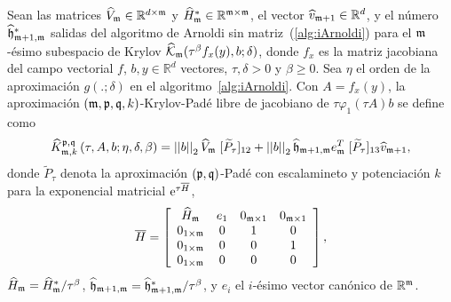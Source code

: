 \begin{definition}\label{def:gen_kp_aprox_fj}
	Sean las matrices $\widehat{V}_{\mathfrak{m}}\in\mathbb{R}^{d\times \mathfrak{m}}$ y $\widehat{H}^*_{\mathfrak{m}}\in\mathbb{R}^{{\mathfrak{m}} \times {\mathfrak{m}}}$, el vector $\widehat{v}_{\mathfrak{m}+1}\in\mathbb{R}^d$, y el número  $ \widehat{\mathfrak{h}}^*_{\mathfrak{m}+1,\mathfrak{m}}$ salidas del algoritmo de Arnoldi sin matriz~(\ref{alg:iArnoldi}) para el $\mathfrak{m}$-ésimo subespacio de Krylov $\widehat{\mathcal{K}}_{\mathfrak{m}}(\tau^\beta f_x(y),b;\delta)$, donde $f_x$ es la matriz jacobiana del campo vectorial $f$, $b,y\in\mathbb{R}^d$ vectores, $\tau,\delta>0$ y $\beta \ge 0$. Sea $\eta$ el orden de la aproximación $g(.;\delta)$ en el algoritmo~\ref{alg:iArnoldi}. Con $A=f_x(y)$, la aproximación $(\mathfrak{m} , \mathfrak{p} ,\mathfrak{q} , k)$-Krylov-Padé libre de jacobiano de $\tau \varphi_1(\tau A)b$ se define como 
	\begin{equation} \label{eq:gen_kp_aprox_fj}
		\widehat{K}_{\mathfrak{m},k}^{\mathfrak{p},\mathfrak{q}}\left(\tau, A , b ; \eta, \delta, \beta \right)=\left\lvert \left\lvert b \right\rvert \right\rvert_2 \widehat{V}_{\mathfrak{m}}\;[\widetilde{P}_{\tau}]_{12} + \left\lvert \left\lvert b \right\rvert \right\rvert_2 \widehat{\mathfrak{h}}_{\mathfrak{m}+1,\mathfrak{m}}e_{\mathfrak{m}}^T\;[\widetilde{P}_{\tau}]_{13} \widehat{v}_{\mathfrak{m}+1},
	\end{equation}
	donde $\widetilde{P}_{\tau}$ denota la aproximación $(\mathfrak{p},\mathfrak{q})$-Padé con escalamineto y potenciación $k$ para la exponencial matricial $\mathrm{e}^{\tau\overline{H}}$, 
	\begin{equation}
		\overline{H} = \left[\begin{array}{cccc}
			\widehat{H}_{\mathfrak{m}} & e_1 & 0_{\mathfrak{m}\times 1} & 0_{\mathfrak{m}\times 1}\\
			0_{1\times\mathfrak{m}} & 0 & 1 & 0\\
			0_{1\times\mathfrak{m}} & 0 & 0 & 1\\
			0_{1\times\mathfrak{m}} & 0 & 0 & 0
		\end{array}\right] \label{hhat},
	\end{equation}
	$\widehat{H}_{\mathfrak{m}}=\widehat{H}^*_{\mathfrak{m}}/\tau^\beta$, $\widehat{\mathfrak{h}}_{\mathfrak{m}+1,\mathfrak{m}}=\widehat{\mathfrak{h}}^*_{\mathfrak{m}+1,\mathfrak{m}}/\tau^\beta$, y $e_i$ el $i$-ésimo vector canónico de $\mathbb{R}^{\mathfrak{m}}$.
\end{definition}


